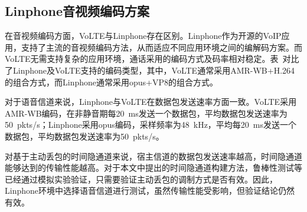 \subsection{Linphone音视频编码方案}
\label{chap:linphone:motivation:coding}


在音视频编码方面，VoLTE与Linphone存在区别。Linphone作为开源的VoIP应用，支持了主流的音视频编码方法，从而适应不同应用环境之间的编解码方案。而VoLTE无需支持复杂的应用环境，通话采用的编码方式及码率相对稳定。表\ 对比了Linphone及VoLTE支持的编码类型，其中，VoLTE通常采用AMR-WB+H.264的组合方式，而Linphone通常采用opus+VP8的组合方式。

对于语音信道来说，Linphone与VoLTE在数据包发送速率方面一致。VoLTE采用AMR-WB编码，在非静音期每{20\ ms}发送一个数据包，平均数据包发送速率为{50\ pkts/s}；Linphone采用opus编码，采样频率为{48\ kHz}，平均每{20\ ms}发送一个数据包，平均数据包发送速率为{50\ pkts/s}。

对基于主动丢包的时间隐通道来说，宿主信道的数据包发送速率越高，时间隐通道能够达到的传输性能越高。对于本文中提出的时间隐通道构建方法，鲁棒性测试等已经通过模拟实验验证，只需要验证主动丢包的调制方式是否有效。因此，Linphone环境中选择语音信道进行测试，虽然传输性能受影响，但验证结论仍然有效。

